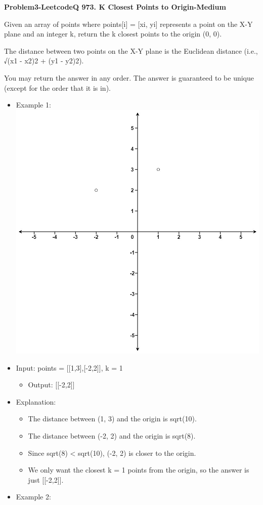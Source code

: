 \documentclass[11pt]{article}
\providecommand{\tightlist}{%
      \setlength{\itemsep}{0pt}\setlength{\parskip}{0pt}}
\begin{document}
    \textbf{Problem3-LeetcodeQ 973. K Closest Points to Origin-Medium}

Given an array of points where points{[}i{]} = {[}xi, yi{]} represents a
point on the X-Y plane and an integer k, return the k closest points to
the origin (0, 0).

The distance between two points on the X-Y plane is the Euclidean
distance (i.e., √(x1 - x2)2 + (y1 - y2)2).

You may return the answer in any order. The answer is guaranteed to be
unique (except for the order that it is in).

\begin{itemize}
\item
  Example 1: \includegraphics{35b9b79b-6d05-4e5f-bbfb-09013435ac4a.jpg}
\item
  Input: points = {[}{[}1,3{]},{[}-2,2{]}{]}, k = 1

  \begin{itemize}
  \tightlist
  \item
    Output: {[}{[}-2,2{]}{]}
  \end{itemize}
\item
  Explanation:

  \begin{itemize}
  \tightlist
  \item
    The distance between (1, 3) and the origin is sqrt(10).
  \item
    The distance between (-2, 2) and the origin is sqrt(8).
  \item
    Since sqrt(8) \textless{} sqrt(10), (-2, 2) is closer to the origin.
  \item
    We only want the closest k = 1 points from the origin, so the answer
    is just {[}{[}-2,2{]}{]}.
  \end{itemize}
\item
  Example 2:


\end{itemize}
\end{document}
